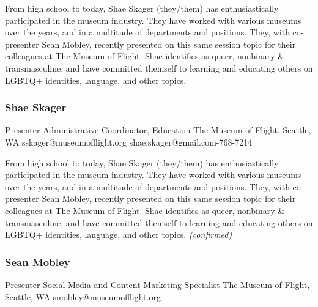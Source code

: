 \documentclass{report}
\begin{document}
              From high school to today, Shae Skager (they/them) has enthusiastically participated in the museum industry. They have worked with various museums over the years, and in a multitude of departments and positions. They, with co-presenter Sean Mobley, recently presented on this same session topic for their colleagues at The Museum of Flight. Shae identifies as queer, nonbinary \& transmasculine, and have committed themself to learning and educating others on LGBTQ+ identities, language, and other topics.\newline


              

              
                \subsubsection*{ Shae Skager }
                Presenter\newline
                Administrative Coordinator, Education\newline
                The Museum of Flight, Seattle, WA
                \newline
                sskager@museumofflight.org\newline
                shae.skager@gmail.com-768-7214\newline

                From high school to today, Shae Skager (they/them) has enthusiastically participated in the museum industry. They have worked with various museums over the years, and in a multitude of departments and positions. They, with co-presenter Sean Mobley, recently presented on this same session topic for their colleagues at The Museum of Flight. Shae identifies as queer, nonbinary \& transmasculine, and have committed themself to learning and educating others on LGBTQ+ identities, language, and other topics.
                \emph{ (confirmed) }
              

              
                \subsubsection*{ Sean Mobley }
                Presenter\newline
                Social Media and Content Marketing Specialist\newline
                The Museum of Flight, Seattle, WA
                \newline
                smobley@museumofflight.org\newline
                
\end{document}
